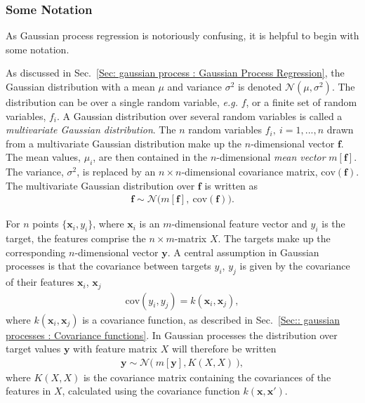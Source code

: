 \documentclass[twoside,english]{uiofysmaster}
\begin{document}
{{\subsubsection{Some Notation}

As Gaussian process regression is notoriously confusing, it is helpful to begin with some notation. 

As discussed in Sec.~\ref{Sec: gaussian process : Gaussian Process Regression}, the Gaussian distribution with a mean $\mu$ and variance $\sigma^2$ is denoted $\mathcal{N}(\mu, \sigma^2)$. The distribution can be over a single random variable, \textit{e.g.} $f$, or a finite set of random variables, $f_i$. A Gaussian distribution over several random variables is called a \textit{multivariate Gaussian distribution}. The $n$ random variables $f_i, ~i=1,...,n$ drawn from a multivariate Gaussian distribution make up the $n$-dimensional vector $\textbf{f}$. The mean values, $\mu_i$, are then contained in the $n$-dimensional \textit{mean vector} $m[\textbf{f}]$. The variance, $\sigma^2$, is replaced by an $n \times n$-dimensional covariance matrix, $\text{cov}(\textbf{f})$. The multivariate Gaussian distribution over $\textbf{f}$ is written as
\begin{align}
\textbf{f} \sim \mathcal{N} \big(m[\textbf{f}], ~\text{cov}(\textbf{f})  \big).
\end{align}  

For $n$ points $\{\textbf{x}_i , y_i\}$, where $\textbf{x}_i$ is an $m$-dimensional feature vector and $y_i$ is the target, the features comprise the $n \times m$-matrix $X$. The targets make up the corresponding $n$-dimensional vector $\textbf{y}$. A central assumption in Gaussian processes is that the covariance between targets $y_i$, $y_j$ is given by the covariance of their features $\textbf{x}_i$, $\textbf{x}_j$
\begin{align}
\text{cov}(y_i, y_j) = k(\textbf{x}_i, \textbf{x}_j),
\end{align}
where $k(\textbf{x}_i, \textbf{x}_j)$ is a covariance function, as described in Sec.~\ref{Sec:: gaussian processes : Covariance functions}. In Gaussian processes the distribution over target values $\textbf{y}$ with feature matrix $X$ will therefore be written
\begin{align}\label{Eq:: gaussian process : Normal distribution GP}
\textbf{y} \sim \mathcal{N} \big(~m[ \textbf{y} ], K(X, X) ~\big),
\end{align}
where $K(X,X)$ is the covariance matrix containing the covariances of the features in $X$, calculated using the covariance function $k(\textbf{x}, \textbf{x}')$.

}}
\end{document}
